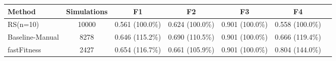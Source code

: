 \begin{tabular}{lcccccc}
\toprule
         Method &  Simulations &              F1 &              F2 &              F3 &              F4 \\
\midrule
       RS(n=10) &        10000 & 0.561 (100.0\%) & 0.624 (100.0\%) & 0.901 (100.0\%) & 0.558 (100.0\%) \\
Baseline-Manual &         8278 & 0.646 (115.2\%) & 0.690 (110.5\%) & 0.901 (100.0\%) & 0.666 (119.4\%) \\
    fastFitness &         2427 & 0.654 (116.7\%) & 0.661 (105.9\%) & 0.901 (100.0\%) & 0.804 (144.0\%) \\
\bottomrule
\end{tabular}
